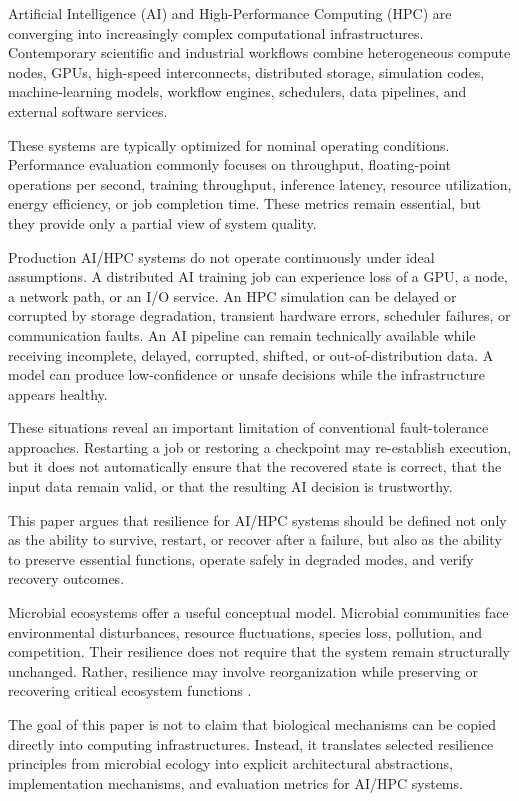 \documentclass[conference]{IEEEtran}
\begin{document}
Artificial Intelligence (AI) and High-Performance Computing (HPC) are converging into increasingly complex computational infrastructures. Contemporary scientific and industrial workflows combine heterogeneous compute nodes, GPUs, high-speed interconnects, distributed storage, simulation codes, machine-learning models, workflow engines, schedulers, data pipelines, and external software services.

These systems are typically optimized for nominal operating conditions. Performance evaluation commonly focuses on throughput, floating-point operations per second, training throughput, inference latency, resource utilization, energy efficiency, or job completion time. These metrics remain essential, but they provide only a partial view of system quality.

Production AI/HPC systems do not operate continuously under ideal assumptions. A distributed AI training job can experience loss of a GPU, a node, a network path, or an I/O service. An HPC simulation can be delayed or corrupted by storage degradation, transient hardware errors, scheduler failures, or communication faults. An AI pipeline can remain technically available while receiving incomplete, delayed, corrupted, shifted, or out-of-distribution data. A model can produce low-confidence or unsafe decisions while the infrastructure appears healthy.

These situations reveal an important limitation of conventional fault-tolerance approaches. Restarting a job or restoring a checkpoint may re-establish execution, but it does not automatically ensure that the recovered state is correct, that the input data remain valid, or that the resulting AI decision is trustworthy.

This paper argues that resilience for AI/HPC systems should be defined not only as the ability to survive, restart, or recover after a failure, but also as the ability to preserve essential functions, operate safely in degraded modes, and verify recovery outcomes.

Microbial ecosystems offer a useful conceptual model. Microbial communities face environmental disturbances, resource fluctuations, species loss, pollution, and competition. Their resilience does not require that the system remain structurally unchanged. Rather, resilience may involve reorganization while preserving or recovering critical ecosystem functions \cite{allison2008,shade2012,philippot2021}.

The goal of this paper is not to claim that biological mechanisms can be copied directly into computing infrastructures. Instead, it translates selected resilience principles from microbial ecology into explicit architectural abstractions, implementation mechanisms, and evaluation metrics for AI/HPC systems.
\end{document}
